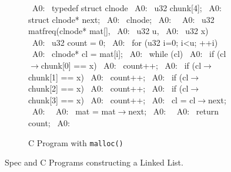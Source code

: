 \begin{figure}[H]
\begin{minipage}[c]{0.50\textwidth}
\begin{subfigure}[t]{\textwidth}
\begin{center}
\begin{allLangEnvScript}
~{\tiny \textcolor{mygray}{A0:}}~ typedef struct clnode {
~{\tiny \textcolor{mygray}{A0:}}~   u32 chunk[4];
~{\tiny \textcolor{mygray}{A0:}}~   struct clnode* next;
~{\tiny \textcolor{mygray}{A0:}}~ } clnode;
~{\tiny \textcolor{mygray}{A0:}}~ 
~{\tiny \textcolor{mygray}{A0:}}~ u32 matfreq(clnode* mat[],
~{\tiny \textcolor{mygray}{A0:}}~             u32 u,
~{\tiny \textcolor{mygray}{A0:}}~             u32 x) {
~{\tiny \textcolor{mygray}{A0:}}~   u32 count = 0;
~{\tiny \textcolor{mygray}{A0:}}~   for (u32 i=0; i<u; ++i) {
~{\tiny \textcolor{mygray}{A0:}}~     clnode* cl = mat[i];
~{\tiny \textcolor{mygray}{A0:}}~     while (cl) {
~{\tiny \textcolor{mygray}{A0:}}~       if (cl$\rightarrow$chunk[0] == x)
~{\tiny \textcolor{mygray}{A0:}}~         count++;
~{\tiny \textcolor{mygray}{A0:}}~       if (cl$\rightarrow$chunk[1] == x)
~{\tiny \textcolor{mygray}{A0:}}~         count++;
~{\tiny \textcolor{mygray}{A0:}}~       if (cl$\rightarrow$chunk[2] == x)
~{\tiny \textcolor{mygray}{A0:}}~         count++;
~{\tiny \textcolor{mygray}{A0:}}~       if (cl$\rightarrow$chunk[3] == x)
~{\tiny \textcolor{mygray}{A0:}}~         count++;
~{\tiny \textcolor{mygray}{A0:}}~       cl = cl$\rightarrow$next;
~{\tiny \textcolor{mygray}{A0:}}~     }
~{\tiny \textcolor{mygray}{A0:}}~     mat = mat$\rightarrow$next;
~{\tiny \textcolor{mygray}{A0:}}~   }
~{\tiny \textcolor{mygray}{A0:}}~   return count;
~{\tiny \textcolor{mygray}{A0:}}~ }








\end{allLangEnvScript}
\end{center}
\vspace{-15px}
\caption{\label{fig:llAllocC}C Program with {\tt malloc()}}
\end{subfigure}%
\end{minipage}%
\caption{\label{fig:llAllocSpecAndC}Spec and C Programs constructing a Linked List.}
\end{figure}

